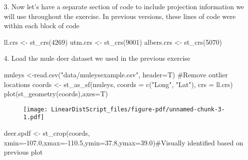 \documentclass[
  letterpaper,
]{book}
\newenvironment{Shaded}{\begin{snugshade}}{\end{snugshade}}
\newcommand{\AttributeTok}[1]{\textcolor[rgb]{0.40,0.45,0.13}{#1}}
\newcommand{\CommentTok}[1]{\textcolor[rgb]{0.37,0.37,0.37}{#1}}
\newcommand{\DecValTok}[1]{\textcolor[rgb]{0.68,0.00,0.00}{#1}}
\newcommand{\FloatTok}[1]{\textcolor[rgb]{0.68,0.00,0.00}{#1}}
\newcommand{\FunctionTok}[1]{\textcolor[rgb]{0.28,0.35,0.67}{#1}}
\newcommand{\NormalTok}[1]{\textcolor[rgb]{0.00,0.23,0.31}{#1}}
\newcommand{\OtherTok}[1]{\textcolor[rgb]{0.00,0.23,0.31}{#1}}
\newcommand{\SpecialCharTok}[1]{\textcolor[rgb]{0.37,0.37,0.37}{#1}}
\newcommand{\StringTok}[1]{\textcolor[rgb]{0.13,0.47,0.30}{#1}}
\begin{document}
3. Now let's have a separate section of code to include projection
information we will use throughout the exercise. In previous versions,
these lines of code were within each block of code

\begin{Shaded}
\begin{Highlighting}[]
\NormalTok{ll.crs }\OtherTok{\textless{}{-}} \FunctionTok{st\_crs}\NormalTok{(}\DecValTok{4269}\NormalTok{)}
\NormalTok{utm.crs }\OtherTok{\textless{}{-}} \FunctionTok{st\_crs}\NormalTok{(}\DecValTok{9001}\NormalTok{)}
\NormalTok{albers.crs }\OtherTok{\textless{}{-}} \FunctionTok{st\_crs}\NormalTok{(}\DecValTok{5070}\NormalTok{)}
\end{Highlighting}
\end{Shaded}

4. Load the mule deer dataset we used in the previous exercise

\begin{Shaded}
\begin{Highlighting}[]
\NormalTok{muleys }\OtherTok{\textless{}{-}}\FunctionTok{read.csv}\NormalTok{(}\StringTok{"data/muleysexample.csv"}\NormalTok{, }\AttributeTok{header=}\NormalTok{T)}
\CommentTok{\#Remove outlier locations}
\NormalTok{coords }\OtherTok{\textless{}{-}} \FunctionTok{st\_as\_sf}\NormalTok{(muleys, }\AttributeTok{coords =} \FunctionTok{c}\NormalTok{(}\StringTok{"Long"}\NormalTok{, }\StringTok{"Lat"}\NormalTok{), }\AttributeTok{crs =}\NormalTok{ ll.crs)}
\FunctionTok{plot}\NormalTok{(}\FunctionTok{st\_geometry}\NormalTok{(coords),}\AttributeTok{axes=}\NormalTok{T)}
\end{Highlighting}
\end{Shaded}

\begin{figure}[H]

{\centering \texttt{[image: LinearDistScript\_files/figure-pdf/unnamed-chunk-3-1.pdf]}

}

\end{figure}

\begin{Shaded}
\begin{Highlighting}[]
\NormalTok{deer.spdf }\OtherTok{\textless{}{-}} \FunctionTok{st\_crop}\NormalTok{(coords, }\AttributeTok{xmin=}\SpecialCharTok{{-}}\FloatTok{107.0}\NormalTok{,}\AttributeTok{xmax=}\SpecialCharTok{{-}}\FloatTok{110.5}\NormalTok{,}\AttributeTok{ymin=}\FloatTok{37.8}\NormalTok{,}\AttributeTok{ymax=}\FloatTok{39.0}\NormalTok{)}\CommentTok{\#Visually identified based on previous plot}
\end{Highlighting}
\end{Shaded}
\end{document}
